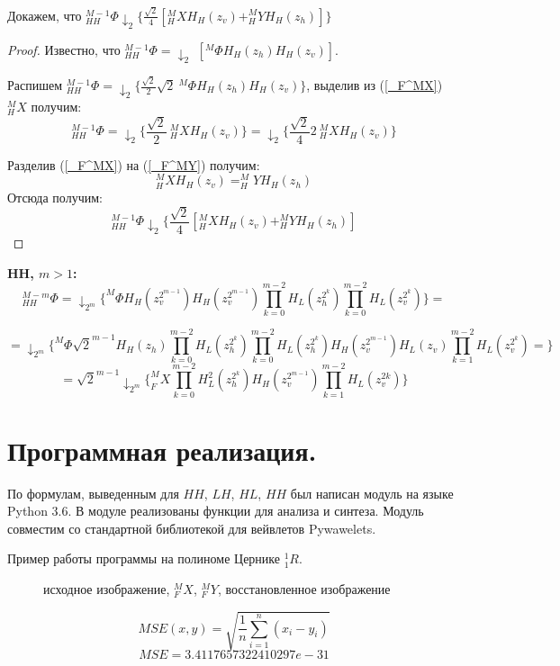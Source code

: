 \documentclass[oneside, final, 14pt]{article}
\begin{document}
Докажем, что $_{HH}^{M-1}\Phi\downarrow_2 \{\frac{\sqrt{2}}{4}[_{H}^MX H_H(z_v) + _{H}^MY H_H(z_h)]\}$
\begin{proof}
Известно, что $_{HH}^{M-1}\Phi = \downarrow_2$ $ [^{M}\Phi H_H(z_h)H_H(z_v)]$.

Распишем \begin{math} _{HH}^{M-1}\Phi = \downarrow_2 \{ \frac{\sqrt{2}}{2}\sqrt{2} ~^{M}\Phi H_H(z_h)H_H(z_v) \} \end{math}, выделив из (\ref{_F^MX}) $_H^MX$ получим:
\[
 _{HH}^{M-1}\Phi = \downarrow_2 \{\frac{\sqrt{2}}{2} ~_{H}^MX H_H(z_v)\} = \downarrow_2 \{\frac{\sqrt{2}}{4}2 ~_{H}^MX H_H(z_v)\}
\]

Разделив (\ref{_F^MX}) на (\ref{_F^MY}) получим:
\[
_{H}^MX H_H(z_v) = _{H}^MY H_H(z_h)
\]
Отсюда получим:
\[
_{HH}^{M-1}\Phi\downarrow_2 \{\frac{\sqrt{2}}{4}[_{H}^MX H_H(z_v) + _{H}^MY H_H(z_h)]
\]
\end{proof}

\textbf{HH, $m>1$:}
\[
_{HH}^{M-m}\Phi=\downarrow_{2^m} \{^M\Phi H_H(z_v^{2^{m-1}}) H_H(z_v^{2^{m-1}}) \prod\limits_{k = 0}^{m-2} H_L(z_h^{2^k})
							\prod\limits_{k = 0}^{m-2} H_L(z_v^{2^k})\}=\]
							
\[
=\downarrow_{2^m} \{^M\Phi \sqrt{2}^{m-1} H_H(z_h) \prod \limits_{k=0}^{m-2} H_L(z_h^{2^k})   
\prod \limits_{k=0}^{m-2} H_L(z_h^{2^k}) H_H(z_v^{2^{m-1}})H_L(z_v) \prod \limits _{k=1}^{m-2}H_L(z_v^{2^k})=
  \}
\]
\[
=\sqrt{2}^{m-1} \downarrow_{2^m} \{_F^MX \prod \limits_{k=0}^{m-2} H_L^2(z_h^{2^k}) H_H(z_v^{2^{m-1}}) \prod \limits_{k=1}^{m-2}H_L(z_v^{2k})    \}
\]
\section{Программная реализация.}
По формулам, выведенным для $HH$, $LH$, $HL$, $HH$ был написан модуль на языке Python 3.6. В модуле реализованы функции для анализа и синтеза. Модуль совместим со стандартной библиотекой для вейвлетов Pywawelets.

Пример работы программы на полиноме Цернике $_1^1R$.
\begin{figure}[h]
\caption{исходное изображение, $_F^MX$, $_F^MY$, восстановленное изображение }
\end{figure}
\[MSE(x, y) = \sqrt{\frac{1}{n}\sum\limits_{i=1}^{n}(x_i - y_i)}\]
\[MSE = 3.4117657322410297e-31\]
\end{document}
